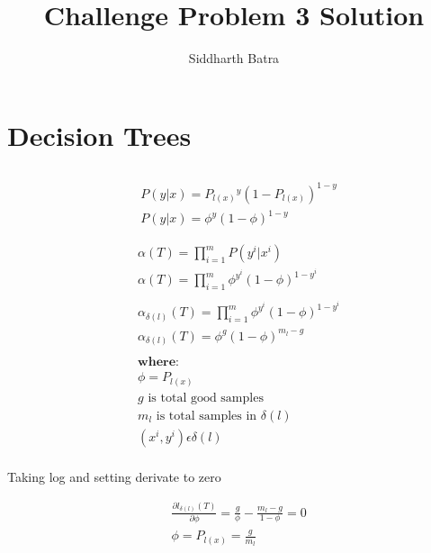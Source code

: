 \documentclass[letterpaper]{article}
\begin{document}
\title{Challenge Problem 3 Solution{}}

\author{Siddharth Batra}

\maketitle


\section{Decision Trees}
\subsection{}
\begin{align*}
 &P(y|x) = P{_{l(x)}}^y(1-P_{l(x)})^{1-y} \\ 
 &P(y|x) = \phi^y(1-\phi)^{1-y}
\end{align*}

\begin{align*}
 &\alpha(T) = \prod_{i=1}^{m} P(y^i|x^i) \\
 &\alpha(T) = \prod_{i=1}^{m}  \phi^{y^i}(1-\phi)^{1-{y^i}}  \\ \\
 &\alpha_{\delta(l)}(T) = \prod_{i=1}^{m}  \phi^{y^i}(1-\phi)^{1-{y^i}} \\
 &\alpha_{\delta(l)}(T) = \phi^{g}(1-\phi)^{m_{l}-g} \\ \\
 &\textbf{where:}\\
 &\phi = P_{l(x)} \\
 &g \text{ is total good samples}\\
 &m_{l} \text{ is total samples in } \delta(l)\\
 &(x^i,y^i) \epsilon \delta(l)  \\
\end{align*}

Taking log and setting derivate to zero

\begin{align*}
 & \frac{\partial l_{\delta(l)}(T)}{\partial \phi} = \frac{g}{\phi} - \frac{m_{l}-g}{1-\phi} = 0\\
& \phi =  P_{l(x)} = \frac{g}{m_{l}}
\end{align*}

\subsection{}
\end{document}
